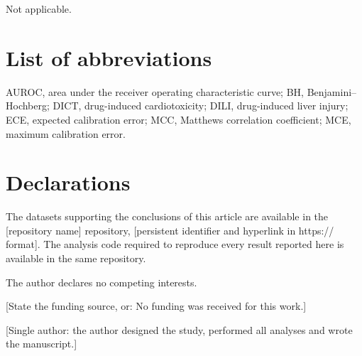 \documentclass[pdflatex,sn-basic,Numbered,referee,lineno]{sn-jnl}%
\theoremstyle{thmstyleone}%
\theoremstyle{thmstyletwo}%
\theoremstyle{thmstylethree}%
\begin{document}
\backmatter


Not applicable.


\section*{List of abbreviations}

AUROC, area under the receiver operating characteristic curve;
BH, Benjamini--Hochberg;
DICT, drug-induced cardiotoxicity;
DILI, drug-induced liver injury;
ECE, expected calibration error;
MCC, Matthews correlation coefficient;
MCE, maximum calibration error.

\section*{Declarations}


The datasets supporting the conclusions of this article are available in the
[repository name] repository, [persistent identifier and hyperlink in https://
format]. The analysis code required to reproduce every result reported here is
available in the same repository.


The author declares no competing interests.


[State the funding source, or: No funding was received for this work.]


[Single author: the author designed the study, performed all analyses and wrote
the manuscript.]
\end{document}
